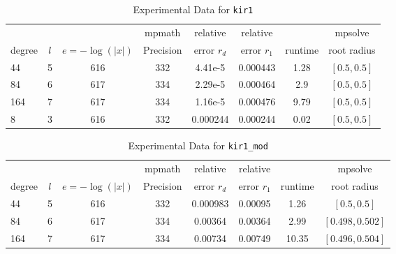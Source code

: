 \documentclass[sigconf]{acmart}
\begin{document}
\begin{table}[t]
\caption{Experimental Data for \texttt{kir1}} %
\label{tab:kir1}
\vskip -0.15in
\begin{center}
\begin{small}
\begin{sc}
\begin{tabular}{lccccccc}
\toprule
&  &  & mpmath & relative  & relative &  & mpsolve \\
degree  & $l$& $e=-\log(|x|)$& Precision &error $r_d$       & error $r_1$ &runtime& root radius\\
\midrule
 44 & 5 & 616 & 332 & 4.41e-5 & 0.000443 & 1.28 & $[0.5, 0.5]$\\
  84 & 6 & 617 & 334 & 2.29e-5 & 0.000464 & 2.9 & $[0.5, 0.5]$\\
 164 & 7 & 617 & 334 & 1.16e-5 & 0.000476 & 9.79 & $[0.5, 0.5]$\\
 8 & 3 & 616 & 332 & 0.000244 & 0.000244 & 0.02 & $[0.5, 0.5]$\\ %
\bottomrule
\end{tabular}
\end{sc}
\end{small}
\end{center}
\vskip 0.05in
\end{table}

\begin{table}[t]
\caption{Experimental Data for \texttt{kir1\_mod}} %
\label{tab:kir1_mod}
\vskip -0.15in
\begin{center}
\begin{small}
\begin{sc}
\begin{tabular}{lccccccc}
\toprule
&  &  & mpmath & relative  & relative &  & mpsolve \\
degree  & $l$& $e=-\log(|x|)$& Precision &error $r_d$       & error $r_1$ &runtime& root radius\\
\midrule
 44 & 5 & 616 & 332 & 0.000983 & 0.00095 & 1.26 & $[0.5, 0.5]$\\
 84 & 6 & 617 & 334 & 0.00364 & 0.00364 & 2.99 & $[0.498, 0.502]$\\
 164 & 7 & 617 & 334 & 0.00734 & 0.00749 & 10.35 & $[0.496, 0.504]$\\ %
\bottomrule
\end{tabular}
\end{sc}
\end{small}
\end{center}
\vskip 0.05in
\end{table}
\end{document}
